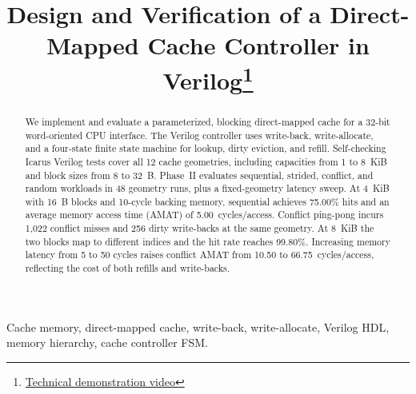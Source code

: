 \documentclass[conference]{IEEEtran}
\begin{document}
\title{Design and Verification of a Direct-Mapped Cache Controller in Verilog\thanks{\protect\href{https://drive.google.com/drive/folders/1WNsOvDRVHSj_vMWKZjpoxVolT6G_y51Q?usp=drive_link}{Technical demonstration video}}}

\author{
    \and
    \and
    \and
    \and
}

\maketitle

\begin{abstract}
We implement and evaluate a parameterized, blocking direct-mapped cache for a 32-bit word-oriented CPU interface. The Verilog controller uses write-back, write-allocate, and a four-state finite state machine for lookup, dirty eviction, and refill. Self-checking Icarus Verilog tests cover all 12 cache geometries, including capacities from 1 to 8~KiB and block sizes from 8 to 32~B. Phase~II evaluates sequential, strided, conflict, and random workloads in 48 geometry runs, plus a fixed-geometry latency sweep. At 4~KiB with 16~B blocks and 10-cycle backing memory, sequential achieves 75.00\% hits and an average memory access time (AMAT) of 5.00~cycles/access. Conflict ping-pong incurs 1,022 conflict misses and 256 dirty write-backs at the same geometry. At 8~KiB the two blocks map to different indices and the hit rate reaches 99.80\%. Increasing memory latency from 5 to 50 cycles raises conflict AMAT from 10.50 to 66.75~cycles/access, reflecting the cost of both refills and write-backs.
\end{abstract}

\begin{IEEEkeywords}
Cache memory, direct-mapped cache, write-back, write-allocate, Verilog HDL, memory hierarchy, cache controller FSM.
\end{IEEEkeywords}
\end{document}
